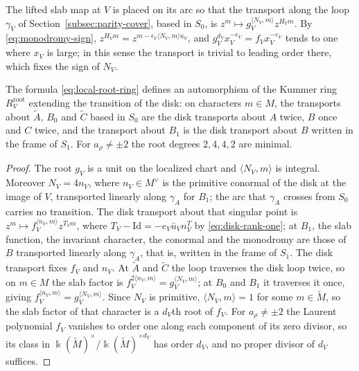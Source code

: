 The lifted slab map at $V$ is placed on its arc so that the transport along
the loop $\gamma_V$ of Section~\ref{subsec:parity-cover}, based in $S_0$, is
$z^m\mapsto g_V^{\langle N_V,m\rangle}z^{H_Vm}$.  By
\eqref{eq:monodromy-sign}, $z^{H_Vm}=z^{m-\epsilon_V\langle N_V,m\rangle u_V}$,
and $g_V^{d_V}x_V^{-e_V}=f_Vx_V^{-e_V}$ tends to one where $x_V$ is large;
in this sense the transport is trivial to leading order there, which fixes
the sign of $N_V$.

\begin{proposition}\label{prop:minimal-roots}
The formula \eqref{eq:local-root-ring} defines an automorphism of the Kummer
ring $R_V^{\mathrm{root}}$ extending the transition of the disk: on
characters $m\in M$, the transports about $\widetilde A$, $B_0$ and $\widetilde C$
based in $S_0$ are the disk transports about $A$ twice, $B$ once and $C$
twice, and the transport about $B_1$ is the disk transport about $B$ written
in the frame of $S_1$.  For $a_\rho\neq\pm2$ the root degrees $2,4,4,2$ are
minimal.
\end{proposition}

\begin{proof}
The root $g_V$ is a unit on the localized chart and
$\langle N_V,m\rangle$ is integral.  Moreover $N_V=4n_V$, where
$n_V\in M^\vee$ is the primitive conormal of the disk at the image of $V$,
transported linearly along $\gamma_A$ for $B_1$; the arc that $\gamma_A$
crosses from $S_0$ carries no transition.  The disk transport about that
singular point is $z^m\mapsto f_V^{\langle n_V,m\rangle}z^{T_Vm}$, where
$T_V-\mathrm{Id}=-e_V\bar u_Vn_V^T$ by \eqref{eq:disk-rank-one}; at $B_1$, the slab function, the invariant
character, the conormal and the monodromy are those of $B$ transported
linearly along $\gamma_A$, that is, written in the frame of $S_1$.  The disk
transport fixes $f_V$ and $n_V$.  At $\widetilde A$ and $\widetilde C$ the
loop traverses the disk loop twice, so on $m\in M$ the slab factor is
$f_V^{2\langle n_V,m\rangle}=g_V^{\langle N_V,m\rangle}$; at $B_0$ and $B_1$
it traverses it once, giving $f_V^{\langle n_V,m\rangle}=g_V^{\langle
N_V,m\rangle}$.  Since $N_V$ is primitive, $\langle N_V,m\rangle=1$ for some
$m\in\widetilde M$, so the slab factor of that character is a $d_V$th root
of $f_V$.  For $a_\rho\neq\pm2$ the Laurent polynomial $f_V$ vanishes to order
one along each component of its zero divisor, so its class in
$\Bbbk(\widetilde M)^\times/\Bbbk(\widetilde M)^{\times d_V}$ has order
$d_V$, and no proper divisor of $d_V$ suffices.
\end{proof}

